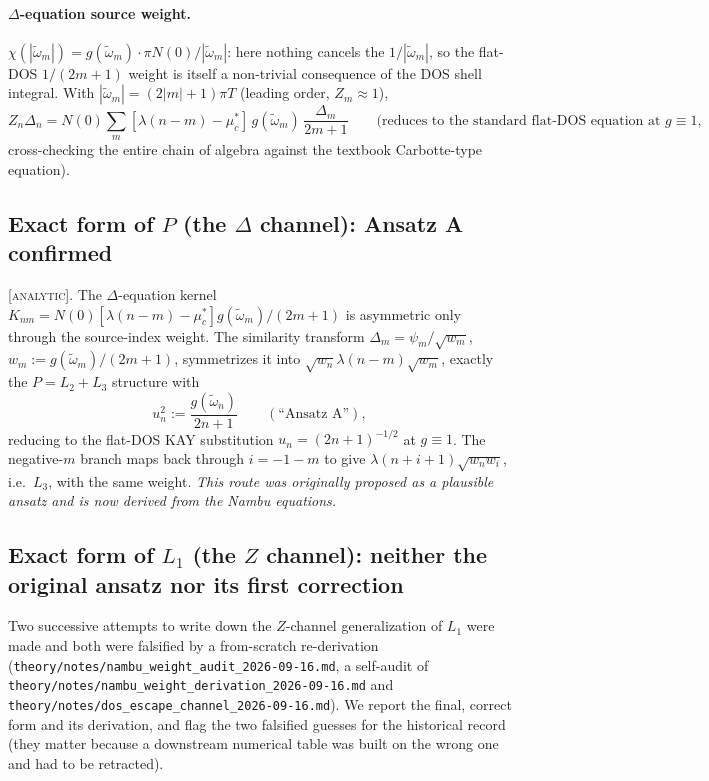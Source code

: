 \documentclass[11pt]{article}
\begin{document}
\paragraph{$\Delta$-equation source weight.}
$\chi(|\tilde\omega_m|)=g(\tilde\omega_m)\cdot\pi N(0)/|\tilde\omega_m|$: here
nothing cancels the $1/|\tilde\omega_m|$, so the flat-DOS
$1/(2m{+}1)$ weight is itself a non-trivial consequence of the DOS shell
integral. With $|\tilde\omega_m|=(2|m|{+}1)\pi T$ (leading order, $Z_m\approx1$),
\[
 Z_n\Delta_n=N(0)\sum_m[\lambda(n-m)-\mu^*_c]\,g(\tilde\omega_m)\,\frac{\Delta_m}{2m+1}
 \qquad(\text{reduces to the standard flat-DOS equation at }g\equiv1,
\]
cross-checking the entire chain of algebra against the textbook Carbotte-type
equation).

\subsection{Exact form of $P$ (the $\Delta$ channel): Ansatz A confirmed}\label{sec:ansatzA}

\textsc{[analytic]}. The $\Delta$-equation kernel
$K_{nm}=N(0)[\lambda(n-m)-\mu^*_c]g(\tilde\omega_m)/(2m{+}1)$ is asymmetric
only through the source-index weight. The similarity transform
$\Delta_m=\psi_m/\sqrt{w_m}$, $w_m:=g(\tilde\omega_m)/(2m+1)$, symmetrizes it
into $\sqrt{w_n}\lambda(n-m)\sqrt{w_m}$, exactly the $P=L_2+L_3$ structure
with
\begin{equation}\label{eq:ansatzA}
 u_n^2 := \frac{g(\tilde\omega_n)}{2n+1} \qquad (\text{``Ansatz A''}),
\end{equation}
reducing to the flat-DOS KAY substitution $u_n=(2n+1)^{-1/2}$ at $g\equiv1$.
The negative-$m$ branch maps back through $i=-1-m$ to give $\lambda(n+i+1)\sqrt{w_nw_i}$,
i.e.\ $L_3$, with the same weight. \emph{This route was originally proposed
as a plausible ansatz and is now derived from the Nambu equations.}

\subsection{Exact form of $L_1$ (the $Z$ channel): neither the original ansatz nor its first correction}\label{sec:Bn}

Two successive attempts to write down the $Z$-channel generalization of $L_1$
were made and both were falsified by a from-scratch re-derivation
(\texttt{theory/notes/nambu\_weight\_audit\_2026-09-16.md}, a self-audit of
\texttt{theory/notes/nambu\_weight\_derivation\_2026-09-16.md} and
\texttt{theory/notes/dos\_escape\_channel\_2026-09-16.md}). We report the
final, correct form and its derivation, and flag the two falsified guesses
for the historical record (they matter because a downstream numerical table
was built on the wrong one and had to be retracted).
\end{document}
